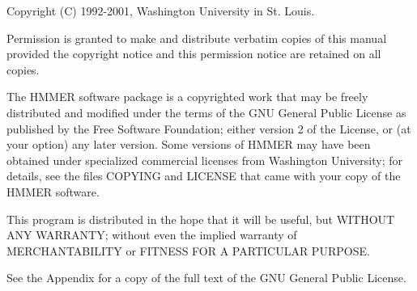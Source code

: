 \vspace*{\fill}
\begin{flushleft}
Copyright (C) 1992-2001, Washington University in St. Louis.\vspace{5mm}

Permission is granted to make and distribute verbatim copies of this
manual provided the copyright notice and this permission notice are
retained on all copies.\vspace{5mm}

The HMMER software package is a copyrighted work that may be freely
distributed and modified under the terms of the GNU General Public
License as published by the Free Software Foundation; either version 2
of the License, or (at your option) any later version. Some versions
of HMMER may have been obtained under specialized commercial licenses
from Washington University; for details, see the files COPYING and
LICENSE that came with your copy of the HMMER software.\vspace{5mm}

This program is distributed in the hope that it will be useful, but
WITHOUT ANY WARRANTY; without even the implied warranty of
MERCHANTABILITY or FITNESS FOR A PARTICULAR PURPOSE.\vspace{5mm}

See the Appendix for a copy of the full text of the GNU General Public
License.\vspace{5mm}

\end{flushleft}
